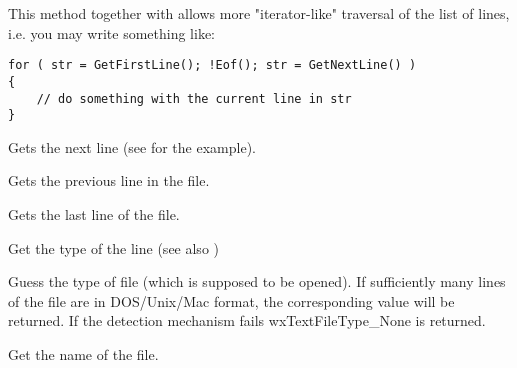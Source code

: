 \label{wxtextfilegetfirstline}


This method together with  
allows more "iterator-like" traversal of the list of lines, i.e. you may
write something like:

\begin{verbatim}
for ( str = GetFirstLine(); !Eof(); str = GetNextLine() )
{
    // do something with the current line in str
}
\end{verbatim}

\label{wxtextfilegetnextline}


Gets the next line (see  for 
the example).

\label{wxtextfilegetprevline}


Gets the previous line in the file.

\label{wxtextfilegetlastline}


Gets the last line of the file.

\label{wxtextfilegetlinetype}


Get the type of the line (see also )

\label{wxtextfileguesstype}


Guess the type of file (which is supposed to be opened). If sufficiently
many lines of the file are in DOS/Unix/Mac format, the corresponding value will
be returned. If the detection mechanism fails wxTextFileType\_None is returned.

\label{wxtextfilegetname}


Get the name of the file.

\label{wxtextfileaddline}

